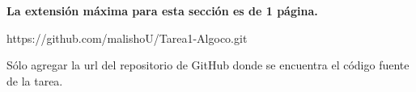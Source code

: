 \begin{mdframed}
    \textbf{La extensión máxima para esta sección es de 1 página.}
\end{mdframed}

https://github.com/malishoU/Tarea1-Algoco.git

Sólo agregar la url del repositorio de GitHub donde se encuentra el código fuente de la tarea. 